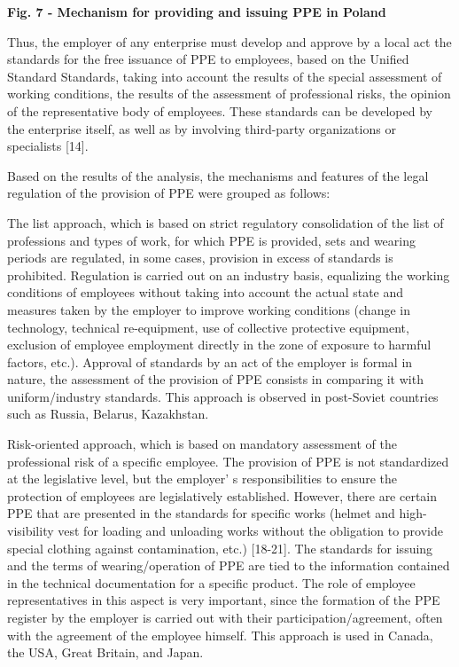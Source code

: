 {{\bfseries Fig. 7 - Mechanism for providing and issuing PPE in Poland}

Thus, the employer of any enterprise must develop and approve by a local
act the standards for the free issuance of PPE to employees, based on
the Unified Standard Standards, taking into account the results of the
special assessment of working conditions, the results of the assessment
of professional risks, the opinion of the representative body of
employees. These standards can be developed by the enterprise itself, as
well as by involving third-party organizations or specialists {[}14{]}.

Based on the results of the analysis, the mechanisms and features of the
legal regulation of the provision of PPE were grouped as follows:

The list approach, which is based on strict regulatory consolidation of
the list of professions and types of work, for which PPE is provided,
sets and wearing periods are regulated, in some cases, provision in
excess of standards is prohibited. Regulation is carried out on an
industry basis, equalizing the working conditions of employees without
taking into account the actual state and measures taken by the employer
to improve working conditions (change in technology, technical
re-equipment, use of collective protective equipment, exclusion of
employee employment directly in the zone of exposure to harmful factors,
etc.). Approval of standards by an act of the employer is formal in
nature, the assessment of the provision of PPE consists in comparing it
with uniform/industry standards. This approach is observed in
post-Soviet countries such as Russia, Belarus, Kazakhstan.

Risk-oriented approach, which is based on mandatory assessment of the
professional risk of a specific employee. The provision of PPE is not
standardized at the legislative level, but the
employer' s responsibilities to ensure the protection of
employees are legislatively established. However, there are certain PPE
that are presented in the standards for specific works (helmet and
high-visibility vest for loading and unloading works without the
obligation to provide special clothing against contamination, etc.)
{[}18-21{]}. The standards for issuing and the terms of
wearing/operation of PPE are tied to the information contained in the
technical documentation for a specific product. The role of employee
representatives in this aspect is very important, since the formation of
the PPE register by the employer is carried out with their
participation/agreement, often with the agreement of the employee
himself. This approach is used in Canada, the USA, Great Britain, and
Japan.

}
